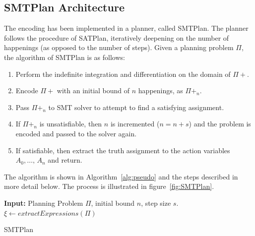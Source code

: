\subsection{SMTPlan Architecture} \label{sssec:SMTPlan_Archi}

The encoding has been implemented in a planner, called {\sc SMTPlan}. The planner follows the procedure of {\sc SATPlan}, iteratively deepening on the number of happenings (as opposed to the number of steps). Given a planning problem $\Pi$, the algorithm of {\sc SMTPlan} is as follows:

\begin{enumerate}
\item
Perform the indefinite integration and differentiation on the domain of $\Pi+$.
\item
Encode $\Pi+$ with an initial bound of $n$ happenings, as $\Pi+_n$.
\item
Pass $\Pi+_n$ to SMT solver to attempt to find a satisfying assignment.
\item
If $\Pi+_n$ is unsatisfiable, then $n$ is incremented ($n=n+s$) and the problem is encoded and passed to the solver again.
\item
If satisfiable, then extract the truth assignment to the action variables $A_0, \ldots,\, A_n$ and return.
\end{enumerate}
The algorithm is shown in Algorithm~\ref{alg:pseudo} and the steps described in more detail below. The process is illustrated in figure~\ref{fig:SMTPlan}.

\begin{algorithm}
\SetAlgoLined
\textbf{Input:} Planning Problem $\Pi$, initial bound $n$, step size $s$.\\
$\xi \leftarrow extractExpressions(\Pi)$
\caption{{\sc SMTPlan}}
\label{alg:pseudo}
\end{algorithm}

